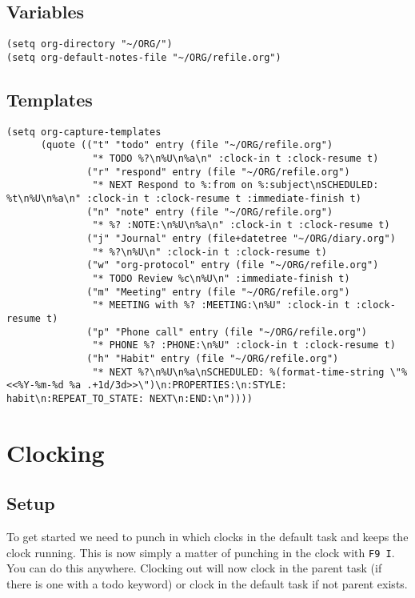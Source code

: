 \documentclass[11pt]{scrartcl}
\begin{document}
\subsection{Variables}
\label{sec:orgheadline19}
\begin{verbatim}
(setq org-directory "~/ORG/")
(setq org-default-notes-file "~/ORG/refile.org")
\end{verbatim}

\subsection{Templates}
\label{sec:orgheadline20}
\begin{verbatim}
(setq org-capture-templates
      (quote (("t" "todo" entry (file "~/ORG/refile.org")
               "* TODO %?\n%U\n%a\n" :clock-in t :clock-resume t)
              ("r" "respond" entry (file "~/ORG/refile.org")
               "* NEXT Respond to %:from on %:subject\nSCHEDULED: %t\n%U\n%a\n" :clock-in t :clock-resume t :immediate-finish t)
              ("n" "note" entry (file "~/ORG/refile.org")
               "* %? :NOTE:\n%U\n%a\n" :clock-in t :clock-resume t)
              ("j" "Journal" entry (file+datetree "~/ORG/diary.org")
               "* %?\n%U\n" :clock-in t :clock-resume t)
              ("w" "org-protocol" entry (file "~/ORG/refile.org")
               "* TODO Review %c\n%U\n" :immediate-finish t)
              ("m" "Meeting" entry (file "~/ORG/refile.org")
               "* MEETING with %? :MEETING:\n%U" :clock-in t :clock-resume t)
              ("p" "Phone call" entry (file "~/ORG/refile.org")
               "* PHONE %? :PHONE:\n%U" :clock-in t :clock-resume t)
              ("h" "Habit" entry (file "~/ORG/refile.org")
               "* NEXT %?\n%U\n%a\nSCHEDULED: %(format-time-string \"%<<%Y-%m-%d %a .+1d/3d>>\")\n:PROPERTIES:\n:STYLE: habit\n:REPEAT_TO_STATE: NEXT\n:END:\n"))))
\end{verbatim}
\section{Clocking}
\label{sec:orgheadline34}
\subsection{Setup}
\label{sec:orgheadline22}

To get started we need to punch in which clocks in the default
task and keeps the clock running.  This is now simply a matter of
punching in the clock with \texttt{F9 I}.  You can do this anywhere.
Clocking out will now clock in the parent task (if there is one
with a todo keyword) or clock in the default task if not parent
exists.
\end{document}
